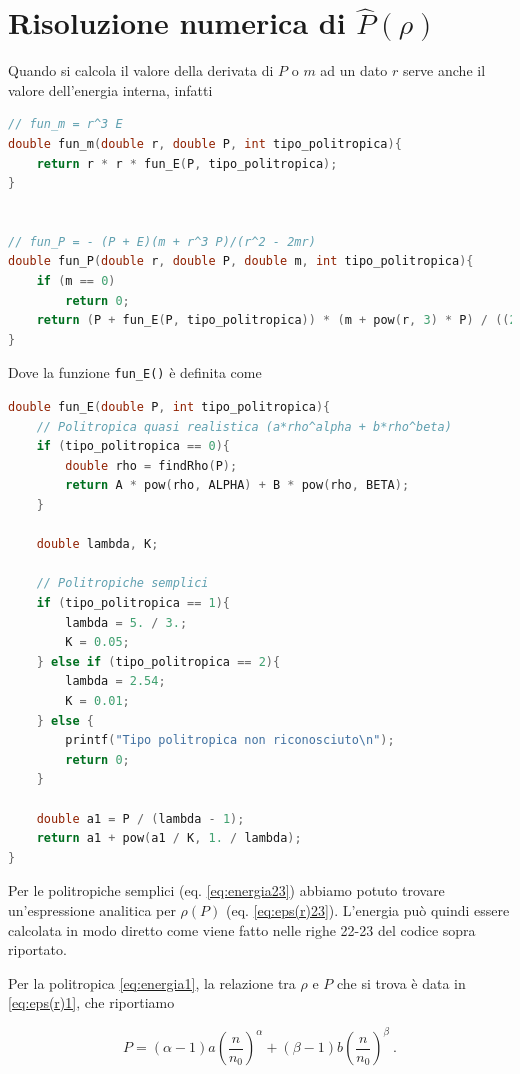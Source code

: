 \documentclass[a4paper, titlepage]{article}
\begin{document}
\section{Risoluzione numerica di $\hat P (\rho)$} \label{ap:eps(r)1}

Quando si calcola il valore della derivata di $P$ o $m$ ad un dato $r$ serve anche il valore dell'energia interna, infatti
\begin{lstlisting}[language=C]
// fun_m = r^3 E
double fun_m(double r, double P, int tipo_politropica){
    return r * r * fun_E(P, tipo_politropica);
}


// fun_P = - (P + E)(m + r^3 P)/(r^2 - 2mr)
double fun_P(double r, double P, double m, int tipo_politropica){
    if (m == 0)
        return 0;
    return (P + fun_E(P, tipo_politropica)) * (m + pow(r, 3) * P) / ((2 * m - r) * r);
}
\end{lstlisting}
Dove la funzione \texttt{fun\_E()} è definita come
\begin{lstlisting}[language=C]
double fun_E(double P, int tipo_politropica){
    // Politropica quasi realistica (a*rho^alpha + b*rho^beta)
    if (tipo_politropica == 0){
        double rho = findRho(P);
        return A * pow(rho, ALPHA) + B * pow(rho, BETA);
    }

    double lambda, K;

    // Politropiche semplici
    if (tipo_politropica == 1){
        lambda = 5. / 3.;
        K = 0.05;
    } else if (tipo_politropica == 2){
        lambda = 2.54;
        K = 0.01;
    } else {
        printf("Tipo politropica non riconosciuto\n");
        return 0;
    }

    double a1 = P / (lambda - 1);
    return a1 + pow(a1 / K, 1. / lambda);
}
\end{lstlisting}

Per le politropiche semplici (eq. \ref{eq:energia23}) abbiamo potuto trovare un'espressione analitica per $\rho (P)$ (eq. \ref{eq:eps(r)23}). L'energia può quindi essere calcolata in modo diretto come viene fatto nelle righe 22-23 del codice sopra riportato.

Per la politropica \ref{eq:energia1}, la relazione tra $\rho$ e $P$ che si trova è data in \ref{eq:eps(r)1}, che riportiamo

\begin{equation}
        P = (\alpha - 1) a \left( \frac{n}{n_0} \right)^{\alpha} + (\beta - 1) b \left( \frac{n}{n_0} \right)^{\beta} \ .
        \label{ap:eq:1}
\end{equation}
\end{document}
